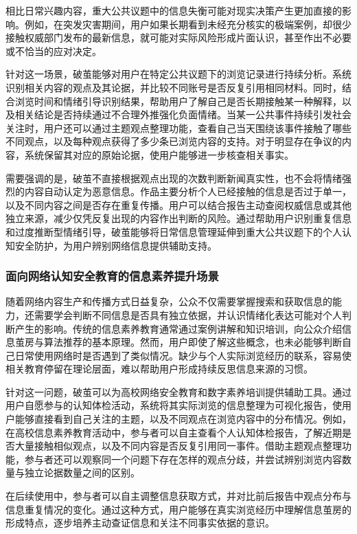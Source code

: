 相比日常兴趣内容，重大公共议题中的信息失衡可能对现实决策产生更加直接的影响。例如，在突发灾害期间，用户如果长期看到未经充分核实的极端案例，却很少接触权威部门发布的最新信息，就可能对实际风险形成片面认识，甚至作出不必要或不恰当的应对决定。

针对这一场景，破茧能够对用户在特定公共议题下的浏览记录进行持续分析。系统识别相关内容的观点及其论据，并比较不同账号是否反复引用相同材料。同时，结合浏览时间和情绪引导识别结果，帮助用户了解自己是否长期接触某一种解释，以及相关结论是否持续通过不合理外推强化负面情绪。当某一公共事件持续引发社会关注时，用户还可以通过主题观点整理功能，查看自己当天围绕该事件接触了哪些不同观点，以及每种观点获得了多少条已浏览内容的支持。对于明显存在争议的内容，系统保留其对应的原始论据，使用户能够进一步核查相关事实。

需要强调的是，破茧不直接根据观点出现的次数判断新闻真实性，也不会将情绪强烈的内容自动认定为恶意信息。作品主要分析个人已经接触的信息是否过于单一，以及不同内容之间是否存在重复传播。用户可以结合报告主动查阅权威信息或其他独立来源，减少仅凭反复出现的内容作出判断的风险。通过帮助用户识别重复信息和过度推断型情绪引导，破茧能够将日常信息管理延伸到重大公共议题下的个人认知安全防护，为用户辨别网络信息提供辅助支持。

\subsubsection{面向网络认知安全教育的信息素养提升场景}\label{section:1.5.3}

随着网络内容生产和传播方式日益复杂，公众不仅需要掌握搜索和获取信息的能力，还需要学会判断不同信息是否具有独立依据，并认识情绪化表达可能对个人判断产生的影响。传统的信息素养教育通常通过案例讲解和知识培训，向公众介绍信息茧房与算法推荐的基本原理。然而，用户即使了解这些概念，也未必能够判断自己日常使用网络时是否遇到了类似情况。缺少与个人实际浏览经历的联系，容易使相关教育停留在理论层面，难以帮助用户形成持续反思信息来源的习惯。

针对这一问题，破茧可以为高校网络安全教育和数字素养培训提供辅助工具。通过用户自愿参与的认知体检活动，系统将其实际浏览的信息整理为可视化报告，使用户能够直接看到自己关注的主题，以及不同观点在浏览内容中的分布情况。例如，在高校信息素养教育活动中，参与者可以自主查看个人认知体检报告，了解近期是否大量接触相似观点，以及不同内容是否反复引用同一事件。借助主题观点整理功能，参与者还可以观察同一个问题下存在怎样的观点分歧，并尝试辨别浏览内容数量与独立论据数量之间的区别。

在后续使用中，参与者可以自主调整信息获取方式，并对比前后报告中观点分布与信息重复情况的变化。通过这种方式，用户能够在真实浏览经历中理解信息茧房的形成特点，逐步培养主动查证信息和关注不同事实依据的意识。

